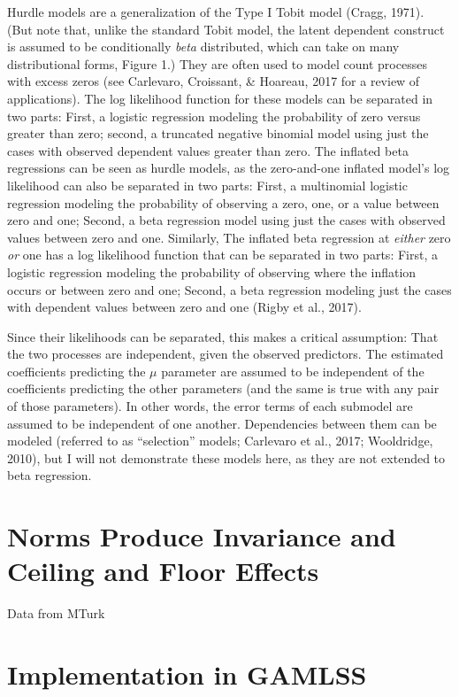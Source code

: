 \documentclass[english,man]{apa6}
\theoremstyle{definition}
\theoremstyle{definition}
\theoremstyle{remark}
\begin{document}
Hurdle models are a generalization of the Type I Tobit model (Cragg,
1971). (But note that, unlike the standard Tobit model, the latent
dependent construct is assumed to be conditionally \emph{beta}
distributed, which can take on many distributional forms, Figure 1.)
They are often used to model count processes with excess zeros (see
Carlevaro, Croissant, \& Hoareau, 2017 for a review of applications).
The log likelihood function for these models can be separated in two
parts: First, a logistic regression modeling the probability of zero
versus greater than zero; second, a truncated negative binomial model
using just the cases with observed dependent values greater than zero.
The inflated beta regressions can be seen as hurdle models, as the
zero-and-one inflated model's log likelihood can also be separated in
two parts: First, a multinomial logistic regression modeling the
probability of observing a zero, one, or a value between zero and one;
Second, a beta regression model using just the cases with observed
values between zero and one. Similarly, The inflated beta regression at
\emph{either} zero \emph{or} one has a log likelihood function that can
be separated in two parts: First, a logistic regression modeling the
probability of observing where the inflation occurs or between zero and
one; Second, a beta regression modeling just the cases with dependent
values between zero and one (Rigby et al., 2017).

Since their likelihoods can be separated, this makes a critical
assumption: That the two processes are independent, given the observed
predictors. The estimated coefficients predicting the \(\mu\) parameter
are assumed to be independent of the coefficients predicting the other
parameters (and the same is true with any pair of those parameters). In
other words, the error terms of each submodel are assumed to be
independent of one another. Dependencies between them can be modeled
(referred to as ``selection'' models; Carlevaro et al., 2017;
Wooldridge, 2010), but I will not demonstrate these models here, as they
are not extended to beta regression.

\section{Norms Produce Invariance and Ceiling and Floor
Effects}\label{norms-produce-invariance-and-ceiling-and-floor-effects}

Data from MTurk

\section{Implementation in GAMLSS}\label{implementation-in-gamlss}
\end{document}
